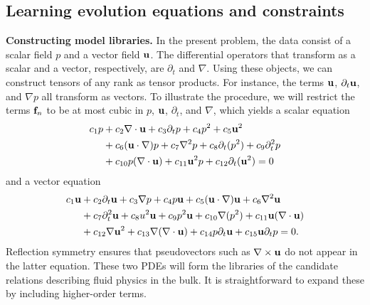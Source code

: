 \documentclass[
 reprint,
 amsmath,amssymb,
 aps,
]{revtex4-2}
\begin{document}
\subsection*{Learning evolution equations and constraints}
{\bf Constructing model libraries.} In the present problem, the data consist of a scalar field $p$ and a vector field ${\bf u}$. The differential operators that transform as a scalar and a vector, respectively, are $\partial_t$ and $\nabla$. Using these objects, we can construct tensors of any rank as tensor products. For instance, the terms ${\bf u}$, $\partial_t{\bf u}$, and $\nabla p$ all transform as vectors. To illustrate the procedure, we will restrict the terms ${\bf f}_n$ to be at most cubic in $p$, ${\bf u}$, $\partial_t$, and $\nabla$, which yields a scalar equation
\begin{equation}
\begin{aligned}
c_1p&+c_2\nabla\cdot{\bf u}+c_3 \partial_t p+c_4p^2+c_5{\bf u}^2\\
&+c_6({\bf u}\cdot\nabla)p+c_7\nabla^2p+c_8\partial_t(p^2)+c_9\partial^2_tp\\
&+c_{10}p(\nabla\cdot {\bf u})+c_{11}{\bf u}^2p+c_{12}\partial_t({\bf u}^2)=0
\label{eq:rank0}
\end{aligned}
\end{equation}
and a vector equation
\begin{equation}
\begin{aligned}
c_1{\bf u}&+c_2\partial_t{\bf u}+c_3\nabla p+c_4p{\bf u}+c_5({\bf u}\cdot\nabla){\bf u}+c_6\nabla^2{\bf u}\\
&+c_7\partial^2_t{\bf u}+c_8u^2{\bf u}
+c_9p^2{\bf u}+c_{10}\nabla (p^2)+c_{11}{\bf u}(\nabla\cdot{\bf u})\\
&+c_{12}\nabla{\bf u}^2+c_{13}\nabla(\nabla\cdot{\bf u})+c_{14}p \partial_t {\bf u}+c_{15}{\bf u} \partial_t p = 0.
\label{eq:rank1}
\end{aligned}
\end{equation}
Reflection symmetry ensures that pseudovectors such as $\nabla\times{\bf u}$ do not appear in the latter equation.
These two PDEs will form the libraries of the candidate relations describing fluid physics in the bulk. It is straightforward to expand these by including higher-order terms.
\end{document}
